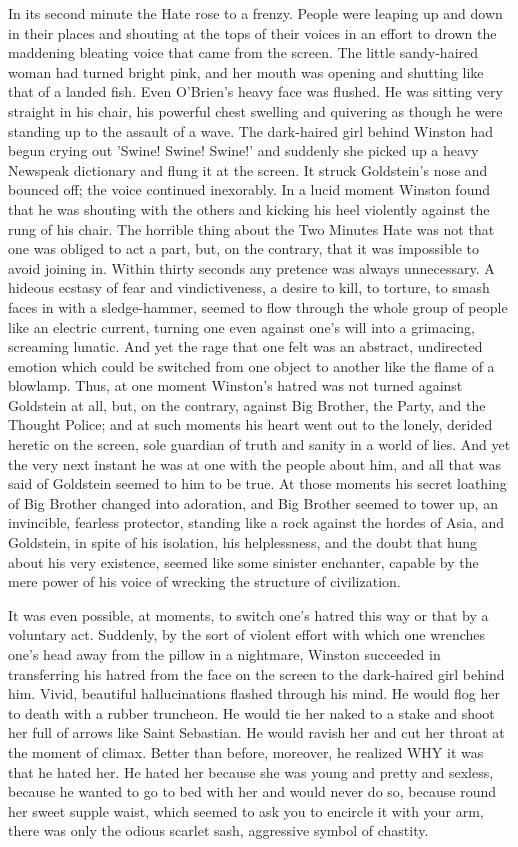\documentclass{article}
\begin{document}
In its second minute the Hate rose to a frenzy. People were leaping up and
down in their places and shouting at the tops of their voices in an effort
to drown the maddening bleating voice that came from the screen. The little
sandy-haired woman had turned bright pink, and her mouth was opening and
shutting like that of a landed fish. Even O'Brien's heavy face was flushed.
He was sitting very straight in his chair, his powerful chest swelling and
quivering as though he were standing up to the assault of a wave. The
dark-haired girl behind Winston had begun crying out 'Swine! Swine! Swine!'
and suddenly she picked up a heavy Newspeak dictionary and flung it at the
screen. It struck Goldstein's nose and bounced off; the voice continued
inexorably. In a lucid moment Winston found that he was shouting with the
others and kicking his heel violently against the rung of his chair. The
horrible thing about the Two Minutes Hate was not that one was obliged to
act a part, but, on the contrary, that it was impossible to avoid joining
in. Within thirty seconds any pretence was always unnecessary. A hideous
ecstasy of fear and vindictiveness, a desire to kill, to torture, to smash
faces in with a sledge-hammer, seemed to flow through the whole group of
people like an electric current, turning one even against one's will into
a grimacing, screaming lunatic. And yet the rage that one felt was an
abstract, undirected emotion which could be switched from one object to
another like the flame of a blowlamp. Thus, at one moment Winston's hatred
was not turned against Goldstein at all, but, on the contrary, against
Big Brother, the Party, and the Thought Police; and at such moments his
heart went out to the lonely, derided heretic on the screen, sole guardian
of truth and sanity in a world of lies. And yet the very next instant he
was at one with the people about him, and all that was said of Goldstein
seemed to him to be true. At those moments his secret loathing of Big
Brother changed into adoration, and Big Brother seemed to tower up, an
invincible, fearless protector, standing like a rock against the hordes
of Asia, and Goldstein, in spite of his isolation, his helplessness, and
the doubt that hung about his very existence, seemed like some sinister
enchanter, capable by the mere power of his voice of wrecking the structure
of civilization.

It was even possible, at moments, to switch one's hatred this way or that
by a voluntary act. Suddenly, by the sort of violent effort with which one
wrenches one's head away from the pillow in a nightmare, Winston succeeded
in transferring his hatred from the face on the screen to the dark-haired
girl behind him. Vivid, beautiful hallucinations flashed through his mind.
He would flog her to death with a rubber truncheon. He would tie her naked
to a stake and shoot her full of arrows like Saint Sebastian. He would
ravish her and cut her throat at the moment of climax. Better than before,
moreover, he realized WHY it was that he hated her. He hated her because
she was young and pretty and sexless, because he wanted to go to bed with
her and would never do so, because round her sweet supple waist, which
seemed to ask you to encircle it with your arm, there was only the odious
scarlet sash, aggressive symbol of chastity.
\end{document}
